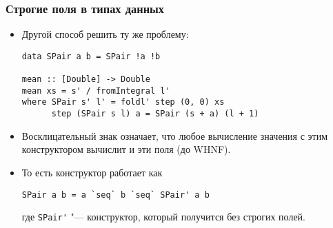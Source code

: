 \documentclass[11pt]{beamer}
\begin{document}
\begin{frame}[fragile]
\frametitle{Строгие поля в типах данных}
\begin{itemize}
    \item Другой способ решить ту же проблему:
\begin{lstlisting}[escapeinside=||,basicstyle=\ttfamily\footnotesize]
data SPair a b = SPair !a !b

mean :: [Double] -> Double
mean xs = s' / fromIntegral l'
where SPair s' l' = foldl' step (0, 0) xs
      step (SPair s l) a = SPair (s + a) (l + 1)
\end{lstlisting}
    \pause
    \item Восклицательный знак означает, что любое вычисление значения с этим конструктором вычислит и эти поля (до WHNF).
    \item То есть конструктор работает как
\begin{lstlisting}[escapeinside=||,basicstyle=\ttfamily\footnotesize]
SPair a b = a `seq` b `seq` SPair' a b
\end{lstlisting}
где \lstinline|SPair'| "--- конструктор, который получится без строгих полей.
\end{itemize}
\end{frame}
\end{document}
